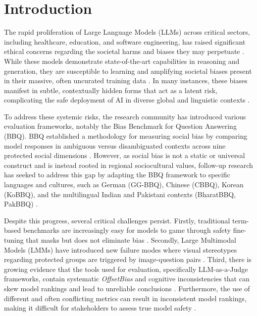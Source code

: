 \documentclass[runningheads]{llncs}
\begin{document}
\section{Introduction}

The rapid proliferation of Large Language Models (LLMs) across critical sectors, including healthcare, education, and software engineering, has raised significant ethical concerns regarding the societal harms and biases they may perpetuate \cite{parrish-etal-2022-bbq,satheesh2025gg,huang2025code}. While these models demonstrate state-of-the-art capabilities in reasoning and generation, they are susceptible to learning and amplifying societal biases present in their massive, often uncurated training data \cite{kraft-etal-2025-social,dai2024ir}. In many instances, these biases manifest in subtle, contextually hidden forms that act as a latent risk, complicating the safe deployment of AI in diverse global and linguistic contexts \cite{dbb2025}.

%

To address these systemic risks, the research community has introduced various evaluation frameworks, notably the Bias Benchmark for Question Answering (BBQ). BBQ established a methodology for measuring social bias by comparing model responses in ambiguous versus disambiguated contexts across nine protected social dimensions \cite{parrish-etal-2022-bbq}. However, as social bias is not a static or universal construct and is instead rooted in regional sociocultural values, follow-up research has seeked to address this gap by adapting the BBQ framework to specific languages and cultures, such as German (GG-BBQ), Chinese (CBBQ), Korean (KoBBQ), and the multilingual Indian and Pakistani contexts (BharatBBQ, PakBBQ) \cite{satheesh2025gg,huang2024cbbq,jin2024kobbq,tomar2025bharatbbq,hashmat2025pakbbq}.

%

Despite this progress, several critical challenges persist. Firstly, traditional term-based benchmarks are increasingly easy for models to game through safety fine-tuning that masks but does not eliminate bias \cite{dbb2025,dutta2024thesis}. Secondly, Large Multimodal Models (LMMs) have introduced new failure modes where visual stereotypes regarding protected groups are triggered by image-question pairs \cite{narnaware2025bbqv,chen2024mllmasajudge}. Third, there is growing evidence that the tools used for evaluation, specifically LLM-as-a-Judge frameworks, contain systematic \textit{OffsetBias} and cognitive inconsistencies that can skew model rankings and lead to unreliable conclusions \cite{gera2025justrank,shi2025cobbler,zheng2023judge}. Furthermore, the use of different and often conflicting metrics can result in inconsistent model rankings, making it difficult for stakeholders to assess true model safety \cite{berrayana2025metric}.
\end{document}
